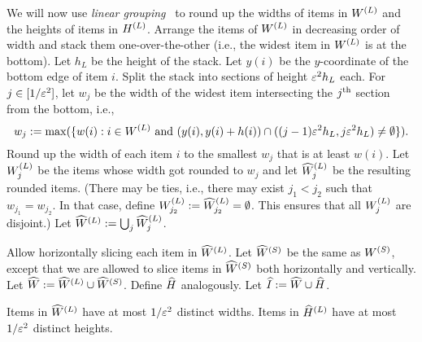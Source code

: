 We will now use \emph{linear grouping}~\cite{bp-aptas,kenyon1996strip}
to round up the widths of items in $W^{(L)}$ and the heights of items in $H^{(L)}$.
Arrange the items of $W^{(L)}$ in decreasing order of width and stack them
one-over-the-other (i.e., the widest item in $W^{(L)}$ is at the bottom).
Let $h_L$ be the height of the stack.
Let $y(i)$ be the $y$-coordinate of the bottom edge of item $i$.
Split the stack into sections of height $\varepsilon^2h_L$ each.
For $j \in [1/\varepsilon^2]$, let $w_j$ be the width of the
widest item intersecting the $j^{\textrm{th}}$ section from the bottom, i.e.,
\[ w_j := \max(\{w(i): i \in W^{(L)} \textrm{ and } (y(i), y(i) + h(i))
    \cap ((j-1)\varepsilon^2 h_L, j\varepsilon^2 h_L) \neq \emptyset\}). \]
Round up the width of each item $i$ to the smallest $w_j$ that is at least $w(i)$.
Let $W^{(L)}_j$ be the items whose width got rounded to $w_j$
and let $\widehat{W}^{(L)}_j$ be the resulting rounded items.
(There may be ties, i.e., there may exist $j_1 < j_2$ such that $w_{j_1} = w_{j_2}$.
In that case, define $W^{(L)}_{j_2} := \widehat{W}^{(L)}_{j_2} = \emptyset$.
This ensures that all $W^{(L)}_j$ are disjoint.)
Let $\widehat{W}^{(L)} := \bigcup_j \widehat{W}^{(L)}_j$.

Allow horizontally slicing each item in $\widehat{W}^{(L)}$.
Let $\widehat{W}^{(S)}$ be the same as $W^{(S)}$, except that we are allowed
to slice items in $\widehat{W}^{(S)}$ both horizontally and vertically.
Let $\widehat{W} := \widehat{W}^{(L)} \cup \widehat{W}^{(S)}$.
Define $\widehat{H}$ analogously. Let $\widehat{I} := \widehat{W} \cup \widehat{H}$.

\begin{claim}
Items in $\widehat{W}^{(L)}$ have at most $1/\varepsilon^2$ distinct widths.
Items in $\widehat{H}^{(L)}$ have at most $1/\varepsilon^2$ distinct heights.
\end{claim}


